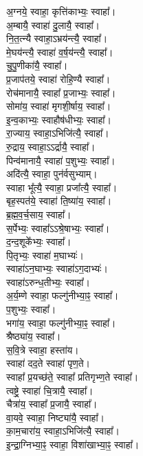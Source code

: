 अ॒ग्नये॒ स्वाहा॒ कृत्ति॑काभ्यः॒ स्वाहा᳚।\\
अ॒म्बायै॒ स्वाहा॑ दु॒लायै॒ स्वाहा᳚।\\
नि॒त॒त्न्यै स्वाहा॒ऽभ्रय॑न्त्यै॒ स्वाहा᳚।\\
मे॒घय॑न्त्यै॒ स्वाहा॑ व॒र्ष॒य॑न्त्यै॒ स्वाहा᳚।\\
चु॒पु॒णीका॑यै॒ स्वाहा᳚।\\
प्र॒जाप॑तये॒ स्वाहा॑ रोहि॒ण्यै स्वाहा᳚।\\
रोच॑मानायै॒ स्वाहा᳚ प्र॒जाभ्यः॒ स्वाहा᳚।\\
सोमा॑य॒ स्वाहा॑ मृगशी॒र्षाय॒ स्वाहा᳚।\\
इ॒न्व॒काभ्यः॒ स्वाहौष॑धीभ्यः॒ स्वाहा᳚।\\
रा॒ज्याय॒ स्वाहा॒ऽभिजि॑त्यै॒ स्वाहा᳚।\\
रु॒द्राय॒ स्वाहा॒ऽऽर्द्रायै॒ स्वाहा᳚।\\
पिन्व॑मानायै॒ स्वाहा॑ प॒शुभ्यः॒ स्वाहा᳚।\\
अदि॑त्यै॒ स्वाहा॒ पुन॑र्वसुभ्याम्।\\
स्वाहा भू᳚त्यै॒ स्वाहा॒ प्रजा᳚त्यै॒ स्वाहा᳚।\\
बृह॒स्पत॑ये॒ स्वाहा॑ ति॒ष्या॑य॒ स्वाहा᳚।\\
ब्र॒ह्म॒व॒र्च॒साय॒ स्वाहा᳚।\\
स॒र्पेभ्यः॒ स्वाहा᳚ऽऽश्रे॒षाभ्यः॒ स्वाहा᳚।\\
द॒न्द॒शूके᳚भ्यः॒ स्वाहा᳚।\\
पि॒तृभ्यः॒ स्वाहा॑ म॒घाभ्यः॑।\\
स्वाहा॑ऽन॒घाभ्यः॒ स्वाहा॑ऽग॒दाभ्यः॑।\\
स्वाहा॑ऽरुन्ध॒तीभ्यः॒ स्वाहा᳚।\\
अ॒र्य॒म्णे स्वाहा॒ फल्गु॑नीभ्या॒ꣴ॒ स्वाहा᳚।\\
प॒शुभ्यः॒ स्वाहा᳚।\\
भगा॑य॒ स्वाहा॒ फल्गु॑नीभ्या॒ꣴ॒ स्वाहा᳚।\\
श्रैष्ठ्या॑य॒ स्वाहा᳚।\\
स॒वि॒त्रे स्वाहा॒ हस्ता॑य।\\
स्वाहा॑ दद॒ते स्वाहा॑ पृण॒ते।\\
स्वाहा᳚ प्र॒यच्छ॑ते॒ स्वाहा᳚ प्रतिगृभ्ण॒ते स्वाहा᳚।\\
त्वष्ट्रे॒ स्वाहा॑ चि॒त्रायै॒ स्वाहा᳚।\\
चैत्रा॑य॒ स्वाहा᳚ प्र॒जायै॒ स्वाहा᳚।\\
वा॒यवे॒ स्वाहा॒ निष्ट्या॑यै॒ स्वाहा᳚।\\
का॒म॒चारा॑य॒ स्वाहा॒ऽभिजि॑त्यै॒ स्वाहा᳚।\\
इ॒न्द्रा॒ग्निभ्या॒ꣴ॒ स्वाहा॒ विशा॑खाभ्या॒ꣴ॒ स्वाहा᳚।\\
